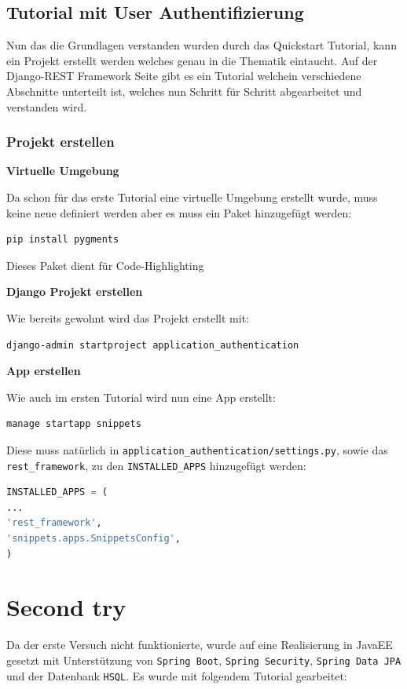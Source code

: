 \subsection{Tutorial mit User Authentifizierung}
Nun das die Grundlagen verstanden wurden durch das Quickstart Tutorial, kann ein Projekt erstellt werden welches genau in die Thematik eintaucht. Auf der Django-REST Framework Seite gibt es ein Tutorial welchein verschiedene Abschnitte unterteilt ist, welches nun Schritt für Schritt abgearbeitet und verstanden wird. 

\subsubsection{Projekt erstellen}
\textbf{Virtuelle Umgebung}

Da schon für das erste Tutorial eine virtuelle Umgebung erstellt wurde, muss keine neue definiert werden aber es muss ein Paket hinzugefügt werden:

\begin{lstlisting}[language=bash]
pip install pygments
\end{lstlisting}

Dieses Paket dient für Code-Highlighting

\textbf{Django Projekt erstellen}

Wie bereits gewohnt wird das Projekt erstellt mit: 

\begin{lstlisting}[language=bash]
django-admin startproject application_authentication
\end{lstlisting}

\textbf{App erstellen}

Wie auch im ersten Tutorial wird nun eine App erstellt:

\begin{lstlisting}[language=bash]
manage startapp snippets
\end{lstlisting}

Diese muss natürlich in \verb|application_authentication/settings.py|, sowie das \verb|rest_framework|, zu den \verb|INSTALLED_APPS| hinzugefügt werden:

\begin{lstlisting}[language=python]
INSTALLED_APPS = (
...
'rest_framework',
'snippets.apps.SnippetsConfig',
)
\end{lstlisting}

\section{Second try}
Da der erste Versuch nicht funktionierte, wurde auf eine Realisierung in JavaEE gesetzt mit Unterstützung von \verb|Spring Boot|, \verb|Spring Security|, \verb|Spring Data JPA| und der Datenbank \verb|HSQL|. Es wurde mit folgendem Tutorial gearbeitet:

